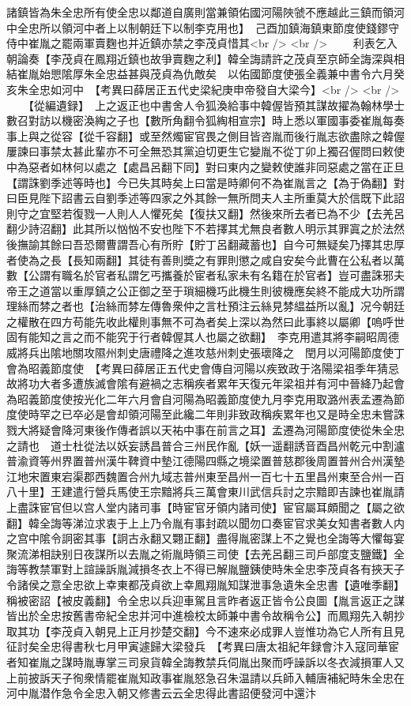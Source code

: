 諸鎮皆為朱全忠所有使全忠以鄰道自廣則當兼領佑國河陽陜虢不應越此三鎮而領河中全忠所以領河中者上以制朝廷下以制李克用也】　己酉加鎮海鎮東節度使錢鏐守侍中崔胤之罷兩軍賣麴也并近鎮亦禁之李茂貞惜其<br />
<br />
　　利表乞入朝論奏【李茂貞在鳳翔近鎮也故爭賣麴之利】韓全誨請許之茂貞至京師全誨深與相結崔胤始愳隂厚朱全忠益甚與茂貞為仇敵矣　以佑國節度使張全義兼中書令六月癸亥朱全忠如河中　【考異曰薛居正五代史梁紀庚申帝發自大梁今】<br />
<br />
　　【從編遺録】　上之返正也中書舍人令狐渙給事中韓偓皆預其謀故擢為翰林學士數召對訪以機密渙綯之子也【數所角翻令狐綯相宣宗】時上悉以軍國事委崔胤每奏事上與之從容【從千容翻】或至然燭宦官畏之側目皆咨胤而後行胤志欲盡除之韓偓屢諫曰事禁太甚此輩亦不可全無恐其黨迫切更生它變胤不從丁卯上獨召偓問曰敕使中為惡者如林何以處之【處昌呂翻下同】對曰東内之變敕使誰非同惡處之當在正旦【謂誅劉季述等時也】今已失其時矣上曰當是時卿何不為崔胤言之【為于偽翻】對曰臣見陛下詔書云自劉季述等四家之外其餘一無所問夫人主所重莫大於信既下此詔則守之宜堅若復戮一人則人人懼死矣【復扶又翻】然後來所去者已為不少【去羌呂翻少詩沼翻】此其所以忷忷不安也陛下不若擇其尤無良者數人明示其罪寘之於法然後撫諭其餘曰吾恐爾曹謂吾心有所貯【貯丁呂翻藏蓄也】自今可無疑矣乃擇其忠厚者使為之長【長知兩翻】其徒有善則奬之有罪則懲之咸自安矣今此曹在公私者以萬數【公謂有職名於官者私謂乞丐攜養於宦者私家未有名籍在於官者】豈可盡誅邪夫帝王之道當以重厚鎮之公正御之至于瑣細機巧此機生則彼機應矣終不能成大功所謂理絲而棼之者也【治絲而棼左傳魯衆仲之言杜預注云絲見棼緼益所以亂】况今朝廷之權散在四方苟能先收此權則事無不可為者矣上深以為然曰此事終以屬卿【嗚呼世固有能知之言之而不能究于行者韓偓其人也屬之欲翻】　李克用遣其將李嗣昭周德威將兵出隂地關攻隰州刺史唐禮降之進攻慈州刺史張瓌降之　閏月以河陽節度使丁會為昭義節度使　【考異曰薛居正五代史會傳自河陽以疾致政于洛陽梁祖季年猜忌故將功大者多遭族滅會隂有避禍之志稱疾者累年天復元年梁祖并有河中晉絳乃起會為昭義節度使按光化二年六月會自河陽為昭義節度使九月李克用取潞州表孟遷為節度使時罕之已卒必是會却領河陽至此纔二年則非致政稱疾累年也又是時全忠未嘗誅戮大將疑會降河東後作傳者誤以天祐中事在前言之耳】孟遷為河陽節度使從朱全忠之請也　道士杜從法以妖妄誘昌普合三州民作亂【妖一遥翻誘音酉昌州乾元中割瀘普渝資等州界置普州漢牛鞞資中墊江德陽四縣之境梁置普慈郡後周置普州合州漢墊江地宋置東宕渠郡西魏置合州九域志普州東至昌州一百七十五里昌州東至合州一百八十里】王建遣行營兵馬使王宗黯將兵三萬會東川武信兵討之宗黯即吉諫也崔胤請上盡誅宦官但以宫人堂内諸司事【時宦官牙領内諸司使】宦官屬耳頗聞之【屬之欲翻】韓全誨等涕泣求衷于上上乃令胤有事封疏以聞勿口奏宦官求美女知書者數人内之宫中隂令詗密其事【詗古永翻又翾正翻】盡得胤密謀上不之覺也全誨等大懼每宴聚流涕相訣别日夜謀所以去胤之術胤時領三司使【去羌呂翻三司戶部度支鹽鐵】全誨等教禁軍對上諠譟訴胤減損冬衣上不得已解胤鹽銕使時朱全忠李茂貞各有挾天子令諸侯之意全忠欲上幸東都茂貞欲上幸鳳翔胤知謀泄事急遺朱全忠書【遺唯季翻】稱被密詔【被皮義翻】令全忠以兵迎車駕且言昨者返正皆令公良圖【胤言返正之謀皆出於全忠按舊書帝紀全忠并河中進檢校太師兼中書令故稱令公】而鳳翔先入朝抄取其功【李茂貞入朝見上正月抄楚交翻】今不速來必成罪人豈惟功為它人所有且見征討矣全忠得書秋七月甲寅遽歸大梁發兵　【考異曰唐太祖紀年録會汴入寇同華宦者知崔胤之謀時胤專掌三司泉貨韓全誨教禁兵伺胤出聚而呼譟訴以冬衣減損軍人又上前披訴天子徇衆情罷崔胤知政事崔胤怒急召朱温請以兵師入輔唐補紀時朱全忠在河中胤潜作急令全忠入朝又修書云云全忠得此書詔便發河中還汴
